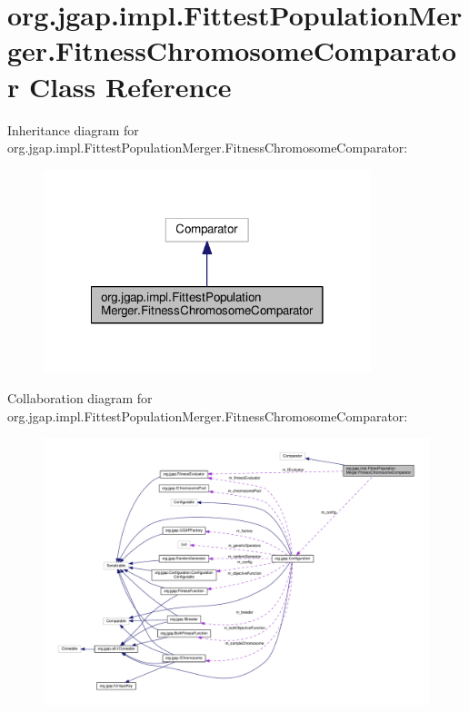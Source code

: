 \hypertarget{classorg_1_1jgap_1_1impl_1_1_fittest_population_merger_1_1_fitness_chromosome_comparator}{\section{org.\-jgap.\-impl.\-Fittest\-Population\-Merger.\-Fitness\-Chromosome\-Comparator Class Reference}
\label{classorg_1_1jgap_1_1impl_1_1_fittest_population_merger_1_1_fitness_chromosome_comparator}
}


Inheritance diagram for org.\-jgap.\-impl.\-Fittest\-Population\-Merger.\-Fitness\-Chromosome\-Comparator\-:
\nopagebreak
\begin{figure}[H]
\begin{center}
\leavevmode
\includegraphics[width=270pt]{classorg_1_1jgap_1_1impl_1_1_fittest_population_merger_1_1_fitness_chromosome_comparator__inherit__graph}
\end{center}
\end{figure}


Collaboration diagram for org.\-jgap.\-impl.\-Fittest\-Population\-Merger.\-Fitness\-Chromosome\-Comparator\-:
\nopagebreak
\begin{figure}[H]
\begin{center}
\leavevmode
\includegraphics[width=350pt]{classorg_1_1jgap_1_1impl_1_1_fittest_population_merger_1_1_fitness_chromosome_comparator__coll__graph}
\end{center}
\end{figure}

